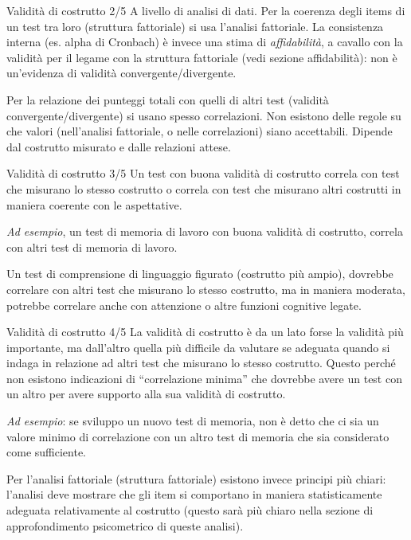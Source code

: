 \documentclass[
  ignorenonframetext,
  aspectratio=169,
]{beamer}
\begin{document}
\begin{frame}{Validità di costrutto 2/5}
\label{validituxe0-di-costrutto-25}
A livello di analisi di dati. Per la coerenza degli items di un test tra
loro (struttura fattoriale) si usa l'analisi fattoriale. La consistenza
interna (es. alpha di Cronbach) è invece una stima di
\emph{affidabilità}, a cavallo con la validità per il legame con la
struttura fattoriale (vedi sezione affidabilità): non è un'evidenza di
validità convergente/divergente.

\vfill

Per la relazione dei punteggi totali con quelli di altri test (validità
convergente/divergente) si usano spesso correlazioni. Non esistono delle
regole su che valori (nell'analisi fattoriale, o nelle correlazioni)
siano accettabili. Dipende dal costrutto misurato e dalle relazioni
attese.
\end{frame}

\begin{frame}{Validità di costrutto 3/5}
\label{validituxe0-di-costrutto-35}
Un test con buona validità di costrutto correla con test che misurano lo
stesso costrutto o correla con test che misurano altri costrutti in
maniera coerente con le aspettative.

\emph{Ad esempio}, un test di memoria di lavoro con buona validità di
costrutto, correla con altri test di memoria di lavoro.

Un test di comprensione di linguaggio figurato (costrutto più ampio),
dovrebbe correlare con altri test che misurano lo stesso costrutto, ma
in maniera moderata, potrebbe correlare anche con attenzione o altre
funzioni cognitive legate.
\end{frame}

\begin{frame}{Validità di costrutto 4/5}
\label{validituxe0-di-costrutto-45}
La validità di costrutto è da un lato forse la validità più importante,
ma dall'altro quella più difficile da valutare se adeguata quando si
indaga in relazione ad altri test che misurano lo stesso costrutto.
Questo perché non esistono indicazioni di ``correlazione minima'' che
dovrebbe avere un test con un altro per avere supporto alla sua validità
di costrutto.

\emph{Ad esempio}: se sviluppo un nuovo test di memoria, non è detto che
ci sia un valore minimo di correlazione con un altro test di memoria che
sia considerato come sufficiente.

Per l'analisi fattoriale (struttura fattoriale) esistono invece principi
più chiari: l'analisi deve mostrare che gli item si comportano in
maniera statisticamente adeguata relativamente al costrutto (questo sarà
più chiaro nella sezione di approfondimento psicometrico di queste
analisi).
\end{frame}
\end{document}
